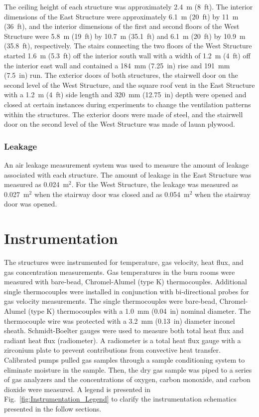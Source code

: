 \documentclass[12pt,oneside]{book}
\begin{document}
The ceiling height of each structure was approximately 2.4~m (8~ft). The interior dimensions of the East Structure were approximately 6.1~m (20~ft) by 11~m (36~ft), and the interior dimensions of the first and second floors of the West Structure were 5.8~m (19~ft) by 10.7~m (35.1~ft) and 6.1~m (20~ft) by 10.9~m (35.8~ft), respectively. The stairs connecting the two floors of the West Structure started 1.6~m (5.3~ft) off the interior south wall with a width of 1.2~m (4~ft) off the interior east wall and contained a 184~mm (7.25~in) rise and 191~mm (7.5~in) run. The exterior doors of both structures, the stairwell door on the second level of the West Structure, and the square roof vent in the East Structure with a 1.2~m (4~ft) side length and 320~mm (12.75~in) depth were opened and closed at certain instances during experiments to change the ventilation patterns within the structures. The exterior doors were made of steel, and the stairwell door on the second level of the West Structure was made of lauan plywood. 

\subsubsection{Leakage}
An air leakage measurement system was used to measure the amount of leakage associated with each structure. The amount of leakage in the East Structure was measured as 0.024~m$^2$. For the West Structure, the leakage was measured as 0.027~m$^2$ when the stairway door was closed and as 0.054~m$^2$ when the stairway door was opened.

\section{Instrumentation}
\label{sec:Instrumentation}
The structures were instrumented for temperature, gas velocity, heat flux, and gas concentration measurements. Gas temperatures in the burn rooms were measured with bare-bead, Chromel-Alumel (type K) thermocouples. Additional single thermocouples were installed in conjunction with bi-directional probes for gas velocity measurements. The single thermocouples were bare-bead, Chromel-Alumel (type K) thermocouples with a 1.0~mm (0.04~in) nominal diameter. The thermocouple wire was protected with a 3.2~mm (0.13~in) diameter inconel sheath. Schmidt-Boelter gauges were used to measure both total heat flux and radiant heat flux (radiometer). A radiometer is a total heat flux gauge with a zirconium plate to prevent contributions from convective heat transfer. Calibrated pumps pulled gas samples through a sample conditioning system to eliminate moisture in the sample. Then, the dry gas sample was piped to a series of gas analyzers and the concentrations of oxygen, carbon monoxide, and carbon dioxide were measured. A legend is presented in Fig.~\ref{fig:Instrumentation_Legend} to clarify the instrumentation schematics presented in the follow sections.
\end{document}
